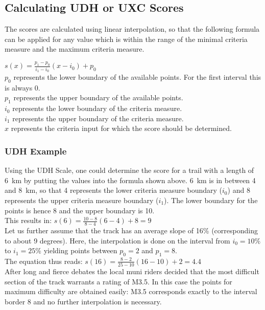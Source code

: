 \documentclass[a4paper,oneside]{scrartcl}
\begin{document}

\subsection{Calculating UDH or UXC Scores}
The scores are calculated using linear interpolation, so that the following formula can be applied for any value which is
within the range of the minimal criteria measure and the maximum criteria measure.

$s(x) = \frac{p_1 - p_0}{i_1 - i_0} (x - i_0) + p_0$\\
%
$p_0$ represents the lower boundary of the available points. For the first interval this is always 0.\\
$p_1$ represents the upper boundary of the available points.\\
$i_0$ represents the lower boundary of the criteria measure.\\
$i_1$ represents the upper boundary of the criteria measure.\\
$x$ represents the criteria input for which the score should be determined.\\



\subsubsection{UDH Example}

Using the UDH Scale, one could determine the score for a trail with a length of
6~km by putting the values into the formula shown above. 6~km is in between 4 and
8~km, so that 4 represents the lower criteria measure boundary ($i_0$) and 8
represents the upper criteria measure boundary ($i_1$). The lower boundary for
the points is hence 8 and the upper boundary is 10.\\
This results in: $s(6) = \frac{10 - 8}{8 - 4} (6 - 4) + 8 = 9$\\

Let us further assume that the track has an average slope of 16\% (corresponding to about 9 degrees).
Here, the interpolation is done on the interval from $i_0 = 10\%$ to $i_1 = 25\%$ yielding points 
between $p_0 = 2$ and $p_1 = 8$. \\
The equation thus reads: $s(16) = \frac{8 - 2}{25 - 10} (16 - 10) + 2 = 4.4$\\

After long and fierce debates the local muni riders decided that the
most difficult section of the track warrants a rating of M3.5. 
In this case the points for maximum difficulty are obtained easily: 
M3.5 corresponds exactly to the interval border 8 and no further
interpolation is necessary. \\
\end{document}
